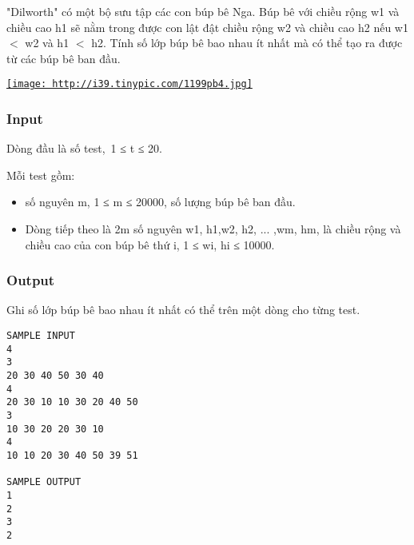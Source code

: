 

"Dilworth" có một bộ sưu tập các con búp bê Nga. Búp bê với chiều rộng w1 và chiều cao h1 sẽ nằm trong được con lật đật chiều rộng w2 và chiều cao h2 nếu w1 $<$ w2 và h1 $<$ h2. Tính số lớp búp bê bao nhau ít nhất mà có thể tạo ra được từ các búp bê ban đầu.

\href{http://tinypic.com}{
\texttt{[image: http://i39.tinypic.com/1199pb4.jpg]}}

\subsubsection{Input}

Dòng đầu là số test, 1 ≤ t ≤ 20.

Mỗi test gồm:
\begin{itemize}
	\item số nguyên m, 1 ≤ m ≤ 20000, số lượng búp bê ban đầu.
	\item Dòng tiếp theo là 2m số nguyên w1, h1,w2, h2, ... ,wm, hm, là chiều rộng và chiều cao của con búp bê thứ i, 1 ≤ wi, hi ≤ 10000.
\end{itemize}

\subsubsection{Output}

Ghi số lớp búp bê bao nhau ít nhất có thể trên một dòng cho từng test.
\begin{verbatim}
SAMPLE INPUT
4
3
20 30 40 50 30 40
4
20 30 10 10 30 20 40 50
3
10 30 20 20 30 10
4
10 10 20 30 40 50 39 51

SAMPLE OUTPUT
1
2
3
2\end{verbatim}